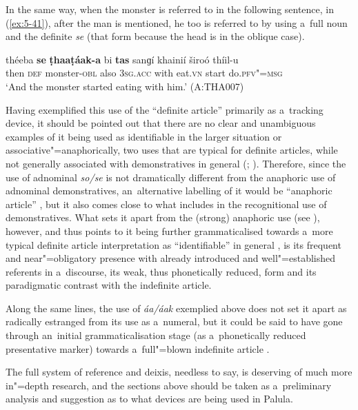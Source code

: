 In the same way, when the monster is referred to in the following sentence, in (\ref{ex:5-41}), after the man is mentioned, he too is referred to by using a~full noun and the definite \textit{se} (that form because the head is in the oblique case).
\begin{exe}
\ex
\label{ex:5-41}
\gll théeba \textbf{se} \textbf{ṭhaaṭáak-a} bi \textbf{tas} sanɡí khainií široó thíil-u\\
then \textsc{def} monster-\textsc{obl} also \textsc{3sg.acc} with eat.\textsc{vn} start do.\textsc{pfv"=msg}\\
\glt `And the monster started eating with him.' (A:THA007)
\end{exe}

Having exemplified this use of the ``definite article'' primarily as a~tracking device, it should be pointed out that there are no clear and unambiguous examples of it being used as identifiable in the larger situation or associative"=anaphorically, two uses that are typical for definite articles, while not generally associated with demonstratives in general (\citealt[485]{juvonen2006}; \citealt[233]{himmelmann1996}). Therefore, since the use of adnominal \textit{so/se} is not dramatically different from the anaphoric use of adnominal demonstratives, an~alternative labelling of it would be ``anaphoric article'' \citep[486]{juvonen2006}, but it also comes close to what \citet[230--239]{himmelmann1996} includes in the recognitional use of demonstratives. What sets it apart from the (strong) anaphoric use (see ), however, and thus points to it being further grammaticalised towards a~more typical definite article interpretation as ``identifiable'' in general \citep[485]{juvonen2006}, is its frequent and near"=obligatory presence with already introduced and well"=established referents in a~discourse, its weak, thus phonetically reduced, form and its paradigmatic contrast with the indefinite article.


Along the same lines, the use of \textit{áa/áak} exemplied above does not set it apart as radically estranged from its use as a~numeral, but it could be said to have gone through an~initial grammaticalisation stage (as a~phonetically reduced presentative marker) towards a~full"=blown indefinite article \citep[486]{juvonen2006}.



The full system of reference and deixis, needless to say, is deserving of much more in"=depth research, and the sections above should be taken as a~preliminary analysis and suggestion as to what devices are being used in Palula.


